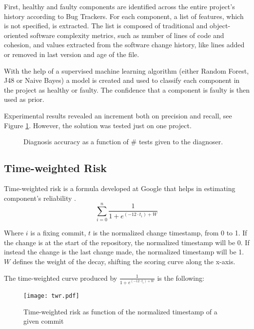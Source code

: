 First, healthy and faulty components are identified across the entire project's history according to Bug Trackers. For each component, a list of features, which is not specified, is extracted. The list is composed of traditional and object-oriented software complexity metrics, such as number of lines of code and cohesion, and values extracted from the software change history, like lines added or removed in last version and age of the file.

With the help of a supervised machine learning algorithm (either Random Forest, J48 or Naive Bayes) a model is created and used to classify each component in the project as healthy or faulty. The confidence that a component is faulty is then used as prior.

Experimental results revealed an increment both on precision and recall, see Figure \ref{fig:elmishali}. However, the solution was tested just on one project.
%
\begin{figure}%
    \centering
    \qquad
    \caption{Diagnosis accuracy as a function of \# tests given to the diagnoser. \cite{Elmishali}}%
    \label{fig:elmishali}%
\end{figure}

\subsection{Time-weighted Risk}

Time-weighted risk is a formula developed at Google that helps in estimating component's reliability \cite{Lewis}.
%
\begin{equation}
  \sum_{i=0}^{n}  \frac {1} {1 + e^{(-12 \cdot t_i) + W}}
\end{equation}

Where $i$ is a fixing commit, $t$ is the normalized change timestamp, from 0 to 1. If the change is at the start of the repository, the normalized timestamp will be 0. If instead the change is the last change made, the normalized timestamp will be 1. $W$ defines the weight of the decay, shifting the scoring curve along the x-axis.

The time-weighted curve produced by $\frac {1} {1 + e^{(-12 \cdot t_i) + W}}$ is the following:
%
\begin{figure}[H]
  \begin{center}
    \leavevmode
    \texttt{[image: twr.pdf]}
    \caption{Time-weighted risk as function of the normalized timestamp of a given commit}
    \label{fig:crowbar-sunburst}
  \end{center}
\end{figure}
